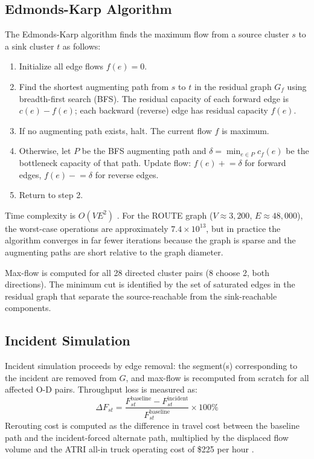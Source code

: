 \subsection{Edmonds-Karp Algorithm}

The Edmonds-Karp algorithm \citep{FordFulkerson1956} finds the maximum flow from a source cluster $s$ to a sink cluster $t$ as follows:

\begin{enumerate}
  \item Initialize all edge flows $f(e) = 0$.
  \item Find the shortest augmenting path from $s$ to $t$ in the residual graph $G_f$ using breadth-first search (BFS). The residual capacity of each forward edge is $c(e) - f(e)$; each backward (reverse) edge has residual capacity $f(e)$.
  \item If no augmenting path exists, halt. The current flow $f$ is maximum.
  \item Otherwise, let $P$ be the BFS augmenting path and $\delta = \min_{e \in P} c_f(e)$ be the bottleneck capacity of that path. Update flow: $f(e) \mathrel{+}= \delta$ for forward edges, $f(e) \mathrel{-}= \delta$ for reverse edges.
  \item Return to step 2.
\end{enumerate}

Time complexity is $O(VE^2)$ \citep{FordFulkerson1956}. For the ROUTE graph ($V \approx 3{,}200$, $E \approx 48{,}000$), the worst-case operations are approximately $7.4 \times 10^{13}$, but in practice the algorithm converges in far fewer iterations because the graph is sparse and the augmenting paths are short relative to the graph diameter.

Max-flow is computed for all 28 directed cluster pairs (8 choose 2, both directions). The minimum cut is identified by the set of saturated edges in the residual graph that separate the source-reachable from the sink-reachable components.

\subsection{Incident Simulation}

Incident simulation proceeds by edge removal: the segment(s) corresponding to the incident are removed from $G$, and max-flow is recomputed from scratch for all affected O-D pairs. Throughput loss is measured as:
\begin{equation}
  \Delta F_{st} = \frac{F_{st}^\text{baseline} - F_{st}^\text{incident}}{F_{st}^\text{baseline}} \times 100\%
\end{equation}
Rerouting cost is computed as the difference in travel cost between the baseline path and the incident-forced alternate path, multiplied by the displaced flow volume and the ATRI all-in truck operating cost of \$225 per hour \citep{ATRI_costs2024}.


